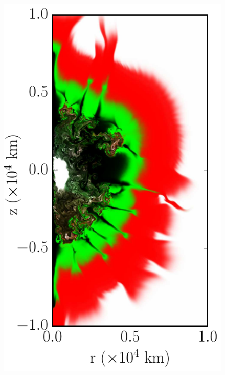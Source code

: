 \documentclass[iop,apj]{emulateapj}
\begin{document}
\begin{figure}[!ht]
\begin{minipage}{0.24\textwidth}
    \includegraphics[width=\linewidth]{"figures/samples/cone_400k_m16_a12_0190"}
  \end{minipage} \hfill 
  \begin{minipage}{0.24\textwidth}

\end{minipage}
\end{figure}
\end{document}
